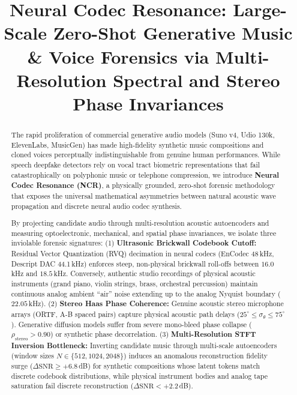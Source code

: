 \documentclass[conference]{IEEEtran}
\theoremstyle{definition}
\begin{document}
\title{Neural Codec Resonance: Large-Scale Zero-Shot Generative Music \& Voice Forensics via Multi-Resolution Spectral and Stereo Phase Invariances}

\author{
}

\maketitle

\begin{abstract}
The rapid proliferation of commercial generative audio models (Suno v4, Udio 130k, ElevenLabs, MusicGen) has made high-fidelity synthetic music compositions and cloned voices perceptually indistinguishable from genuine human performances. While speech deepfake detectors rely on vocal tract biometric representations that fail catastrophically on polyphonic music or telephone compression, we introduce \textbf{Neural Codec Resonance (NCR)}, a physically grounded, zero-shot forensic methodology that exposes the universal mathematical asymmetries between natural acoustic wave propagation and discrete neural audio codec synthesis.

By projecting candidate audio through multi-resolution acoustic autoencoders and measuring optoelectronic, mechanical, and spatial phase invariances, we isolate three inviolable forensic signatures:
(1) \textbf{Ultrasonic Brickwall Codebook Cutoff:} Residual Vector Quantization (RVQ) decimation in neural codecs (EnCodec 48\,kHz, Descript DAC 44.1\,kHz) enforces steep, non-physical brickwall roll-offs between $16.0$\,kHz and $18.5$\,kHz. Conversely, authentic studio recordings of physical acoustic instruments (grand piano, violin strings, brass, orchestral percussion) maintain continuous analog ambient ``air'' noise extending up to the analog Nyquist boundary ($22.05$\,kHz).
(2) \textbf{Stereo Haas Phase Coherence:} Genuine acoustic stereo microphone arrays (ORTF, A-B spaced pairs) capture physical acoustic path delays ($25^\circ \le \sigma_\theta \le 75^\circ$). Generative diffusion models suffer from severe mono-bleed phase collapse ($\rho_{\text{stereo}} > 0.90$) or synthetic phase decorrelation.
(3) \textbf{Multi-Resolution STFT Inversion Bottleneck:} Inverting candidate music through multi-scale autoencoders (window sizes $N \in \{512, 1024, 2048\}$) induces an anomalous reconstruction fidelity surge ($\Delta \text{SNR} \ge +6.8$\,dB) for synthetic compositions whose latent tokens match discrete codebook distributions, while physical instrument bodies and analog tape saturation fail discrete reconstruction ($\Delta \text{SNR} < +2.2$\,dB).


\end{abstract}
\end{document}

